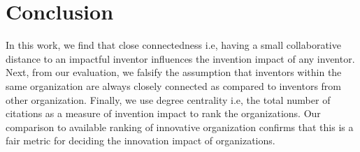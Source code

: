 \section{Conclusion}
In this work, we find that close connectedness i.e, having a small collaborative distance
 to an impactful inventor  influences the
invention impact of any inventor. Next, from our evaluation, we falsify the assumption that 
 inventors within the same organization are always closely connected as compared to
inventors from other organization. Finally, we use degree centrality i.e, the total number of citations 
as a measure of invention impact to rank the organizations. Our comparison to
available ranking of innovative organization confirms that 
this is a fair metric for deciding the innovation impact of organizations.

